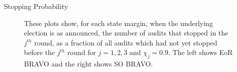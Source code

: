 \documentclass[final]{beamer}
\newcommand{\BRAVO}{\textsc{BRAVO}\xspace}
\newlength{\colwidth}
\begin{document}
\begin{frame}[t]
\begin{columns}[t]
\begin{column}{\colwidth}
\begin{block}{Stopping Probability}
\begin{figure}[h]
\begin{minipage}{.49\textwidth}
\begin{centering}
\label{fig:so_bravo_sprob}
\end{centering}
\end{minipage}
\caption{These plots show, for each state margin, when the underlying election is as announced, the number of audits that stopped in the $j^{th}$ round, as a fraction of all audits which had not yet stopped before the $j^{th}$ round for $j=1,2,3$ and $\chi_j=0.9$. The left shows EoR \BRAVO and the right shows SO \BRAVO.}
\end{figure}
%
%
\begin{figure}[h]
\centering


\end{figure}
\end{block}
\end{column}
\end{columns}
\end{frame}
\end{document}
